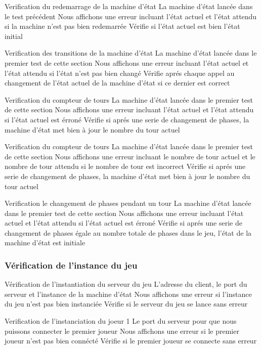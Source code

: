 \mytest
{Verification du redemarrage de la machine d'état}
{La machine d'état lancée dans le test précédent}
{Nous affichons une erreur incluant l'état actuel et l'état attendu si la machine n'est pas bien redemarrée}
{Vérifie si l'état actuel est bien l'état initial}

\mytest
{Verification des transitions de la machine d'état}
{La machine d'état lancée dans le premier test de cette section}
{Nous affichons une erreur incluant l'état actuel et l'état attendu si l'état n'est pas bien changé}
{Vérifie aprés chaque appel au changement de l'état actuel de la machine d'état si ce dernier est correct}

\mytest
{Verification du compteur de tours}
{La machine d'état lancée dans le premier test de cette section}
{Nous affichons une erreur incluant l'état actuel et l'état attendu si l'état actuel est érroné}
{Vérifie si aprés une serie de changement de phases, la machine d'état met bien à jour le nombre du tour actuel}

\mytest
{Verification du compteur de tours}
{La machine d'état lancée dans le premier test de cette section}
{Nous affichons une erreur incluant le nombre de tour actuel et le nombre de tour attendu si le nombre de tour est incorrect}
{Vérifie si aprés une serie de changement de phases, la machine d'état met bien à jour le nombre du tour actuel}

\mytest
{Verification le changement de phases pendant un tour}
{La machine d'état lancée dans le premier test de cette section}
{Nous affichons une erreur incluant l'état actuel et l'état attendu si l'état actuel est érroné}
{Vérifie si aprés une serie de changement de phases égale au nombre totale de phases dans le jeu, l'état de la machine d'état est initiale}

\subsubsection{Vérification de l'instance du jeu}

\mytest
{Vérification de l'instantiation du serveur du jeu}
{L'adresse du client, le port du serveur et l'instance de la machine d'état}
{Nous affichons une erreur si l'instance du jeu n'est pas bien instanciée}
{Vérifie si le serveur du jeu se lance sans erreur}

\mytest
{Verification de l'instanciation du joeur 1}
{Le port du serveur pour que nous puissons connecter le premier joueur}
{Nous affichons une erreur si le premier joueur n'est pas bien connécté}
{Vérifie si le premier joueur se connecte sans erreur}

